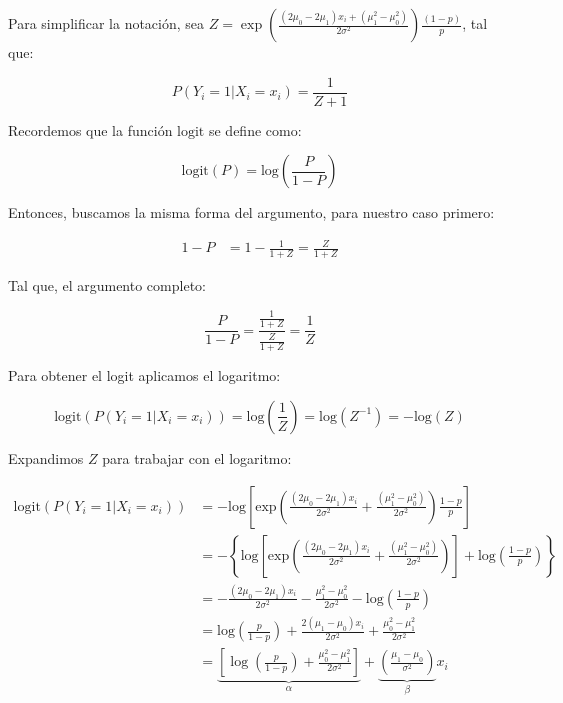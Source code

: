\newpage
Para simplificar la notación, sea $Z =\exp\left(\frac{(2\mu_0-2\mu_1)x_i+(\mu_1^2-\mu_0^2)}{2\sigma^2}\right)\frac{(1-p)}{p}$, tal que: 

\begin{equation}
    P(Y_i=1|X_i=x_i)=\frac{1}{Z+1}
\end{equation}

Recordemos que la función $\text{logit}$ se define como:

\begin{equation}
    \text{logit}(P)=\text{log}\left(\frac{P}{1-P}\right)
\end{equation}

Entonces, buscamos la misma forma del argumento, para nuestro caso primero:

\begin{align*}
    1-P&=1-\frac{1}{1+Z}=\frac{Z}{1+Z}
\end{align*}

Tal que, el argumento completo:

\begin{equation*}
    \frac{P}{1-P}=\frac{\frac{1}{1+Z}}{\frac{Z}{1+Z}}=\frac{1}{Z}
\end{equation*}

Para obtener el logit aplicamos el logaritmo:

\begin{equation*}
    \text{logit}(P(Y_i=1|X_i=x_i))=\text{log} \left(\frac{1}{Z}\right)=\text{log}(Z^{-1})=-\text{log}(Z)
\end{equation*}

Expandimos $Z$ para trabajar con el logaritmo:

\begin{align*}
    \text{logit}(P(Y_i=1|X_i=x_i))&=-\text{log}\left[\text{exp}\left(\frac{(2\mu_0-2\mu_1)x_i}{2\sigma^2}+\frac{(\mu_1^2-\mu_0^2)}{2\sigma^2}\right)\frac{1-p}{p}\right]\\[0.1cm]
    &=-\left\{\text{log}\left[\text{exp}\left(\frac{(2\mu_0-2\mu_1)x_i}{2\sigma^2}+\frac{(\mu_1^2-\mu_0^2)}{2\sigma^2}\right)\right]+\text{log}\left(\frac{1-p}{p}\right)\right\}\\[0.1cm]
    &=-\frac{(2\mu_0-2\mu_1)x_i}{2\sigma^2}-\frac{\mu_1^2-\mu_0^2}{2\sigma^2}-\text{log}\left(\frac{1-p}{p}\right)\\[0.1cm]
    &=\text{log}\left(\frac{p}{1-p}\right)+\frac{2(\mu_1-\mu_0)x_i}{2\sigma^2}+\frac{\mu_0^2-\mu_1^2}{2\sigma^2}\\[0.1cm]
    &=\underbrace{\left[\log\left(\frac{p}{1-p}\right) + \frac{\mu_0^2-\mu_1^2}{2\sigma^2}\right]}_{\alpha} + \underbrace{\left(\frac{\mu_1-\mu_0}{\sigma^2}\right)}_{\beta} x_i\\[0.1cm]
\end{align*}

